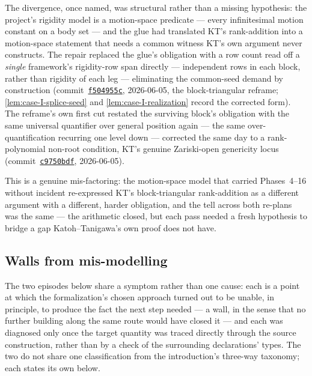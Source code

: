 The divergence, once named, was structural rather than a missing
hypothesis: the project's rigidity model is a motion-space predicate ---
every infinitesimal motion constant on a body set --- and the glue had
translated KT's rank-addition into a motion-space statement that needs a
common witness KT's own argument never constructs. The repair replaced the
glue's obligation with a row count read off a \emph{single} framework's
rigidity-row span directly --- independent rows in each block, rather than
rigidity of each leg --- eliminating the common-seed demand by construction
(commit~\href{https://github.com/bryangingechen/CombinatorialRigidity/commit/f504955c127d13bd7766c7146b3f7601a8be560f}{\texttt{f504955c}},
2026-06-05, the block-triangular reframe; \cref{lem:case-I-splice-seed} and
\cref{lem:case-I-realization} record the corrected form). The reframe's own
first cut restated the surviving block's obligation with the same
universal quantifier over general position again --- the same
over-quantification recurring one level down --- corrected the same day to
a rank-polynomial non-root condition, KT's genuine Zariski-open genericity
locus
(commit~\href{https://github.com/bryangingechen/CombinatorialRigidity/commit/c9750bdfe3993b8c7fbc6bd69b8a9fffa6de15fb}{\texttt{c9750bdf}},
2026-06-05).

This is a genuine mis-factoring: the motion-space model that carried
Phases~4--16 without incident re-expressed KT's block-triangular
rank-addition as a different argument with a different, harder obligation,
and the tell across both re-plans was the same --- the arithmetic closed,
but each pass needed a fresh hypothesis to bridge a gap Katoh--Tanigawa's
own proof does not have.

\subsection{Walls from mis-modelling}
\label{sec:formalization-notes-mismodelling-walls}

The two episodes below share a symptom rather than one cause: each is a
point at which the formalization's chosen approach turned out to be unable,
in principle, to produce the fact the next step needed --- a wall, in the
sense that no further building along the same route would have closed it
--- and each was diagnosed only once the target quantity was traced
directly through the source construction, rather than by a check of the
surrounding declarations' types. The two do not share one classification
from the introduction's three-way taxonomy; each states its own below.

